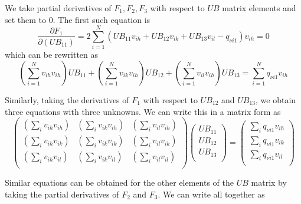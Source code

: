 \documentclass[prb]{revtex4}%
\begin{document}
We take partial derivatives of $F_1, F_2, F_3$ with respect to $UB$ matrix elements and set them to 0.
The first such equation is
\begin{equation}
    \frac{\partial F_1}{\partial (UB_{11})} = 2 \sum_{i=1}^N (UB_{11}v_{ih} + UB_{12}v_{ik} + UB_{13}v_{il} - q_{\nu i 1})v_{ih} = 0
\end{equation}
which can be rewritten as
\begin{equation}
     \left(\sum_{i=1}^N v_{ih}v_{ih}\right) UB_{11} + \left(\sum_{i=1}^N v_{ik}v_{ih}\right) UB_{12} +
     \left(\sum_{i=1}^N v_{il}v_{ih}\right) UB_{13} = \sum_{i=1}^N q_{\nu i 1} v_{ih}
\end{equation}

Similarly, taking the derivatives of $F_1$ with respect to $UB_{12}$ and $UB_{13}$, we obtain three equations with three unknowns.
We can write this in a matrix form as
\begin{equation}
    \left(
      \begin{array}{ccc}
        \left(\sum_{i} v_{ih}v_{ih}\right) & \left(\sum_{i} v_{ik}v_{ih}\right) & \left(\sum_{i} v_{il}v_{ih}\right) \\
        \left(\sum_{i} v_{ih}v_{ik}\right) & \left(\sum_{i} v_{ik}v_{ik}\right) & \left(\sum_{i} v_{il}v_{ik}\right) \\
        \left(\sum_{i} v_{ih}v_{il}\right) & \left(\sum_{i} v_{ik}v_{il}\right) & \left(\sum_{i} v_{il}v_{il}\right) \\
      \end{array}
    \right)
    \left(
      \begin{array}{c}
        UB_{11} \\
        UB_{12} \\
        UB_{13} \\
      \end{array}
    \right)
    =\left(
       \begin{array}{c}
         \sum_{i} q_{\nu i 1} v_{ih} \\
         \sum_{i} q_{\nu i 1} v_{ik} \\
         \sum_{i} q_{\nu i 1} v_{il} \\
       \end{array}
     \right)
\end{equation}

Similar equations can be obtained for the other elements of the $UB$ matrix by taking the partial derivatives of
$F_2$ and $F_3$. We can write all together as
\end{document}
